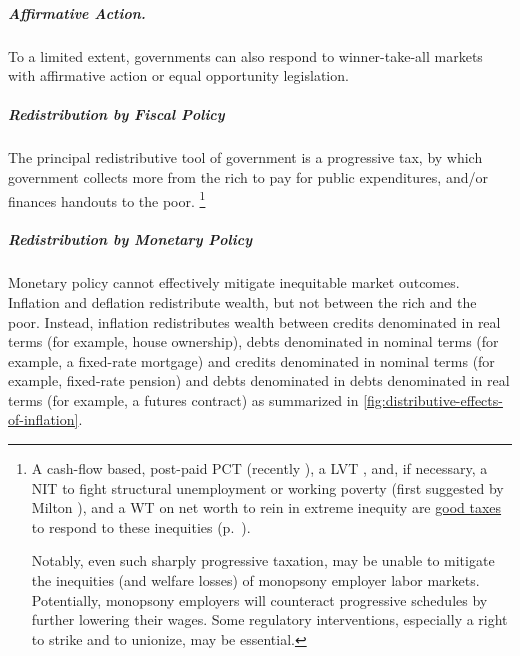 \subparagraph{Affirmative Action.}
	\label{sec:affirmative-action}
To a limited extent, governments can also respond to winner-take-all markets with affirmative action or equal opportunity legislation.

\subparagraph{Redistribution by Fiscal Policy}
	\label{sec:fiscal-redistribution}
The principal redistributive tool of government is a progressive tax, by which government collects more from the rich to pay for public expenditures, and/or finances handouts to the poor.
\footnote{
	A cash-flow based, post-paid \gls{PCT} (recently \citealt{McCaffery2002,McCaffery2005}), a \gls{LVT} \citep{George1879}, and, if necessary, a \gls{NIT} to fight structural unemployment or working poverty (first suggested by Milton \citealt{Friedman1962}), and a \gls{WT} on net worth to rein in extreme inequity are \hyperref[chap:better-tax]{good taxes} to respond to these inequities (p.~\pageref{chap:better-tax}).

	Notably, even such sharply progressive taxation, may be unable to mitigate the inequities (and welfare losses) of monopsony employer labor markets.
	Potentially, monopsony employers will counteract progressive schedules by further lowering their wages.
	Some regulatory interventions, especially a right to strike and to unionize, may be essential.
}




\subparagraph{Redistribution by Monetary Policy}
	\label{sec:distributive-effects-of-inflation}
Monetary policy cannot effectively mitigate inequitable market outcomes.
Inflation and deflation redistribute wealth, but not between the rich and the poor.
Instead, inflation redistributes wealth between credits denominated in real terms (for example, house ownership), debts denominated in nominal terms (for example, a fixed-rate mortgage) and credits denominated in nominal terms (for example, fixed-rate pension) and debts denominated in debts denominated in real terms (for example, a futures contract) as summarized in \autoref{fig:distributive-effects-of-inflation}.

